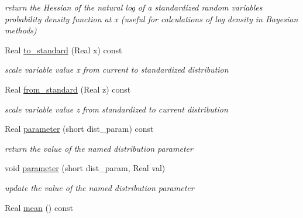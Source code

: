 \begin{DoxyCompactItemize}
\begin{DoxyCompactList}\small\item\em return the Hessian of the natural log of a standardized random variable\textquotesingle{}s probability density function at x (useful for calculations of log density in Bayesian methods) \end{DoxyCompactList}\item 
Real \hyperlink{classPecos_1_1UniformRandomVariable_a42e98c7343a1ce031f5481c11476fa73}{to\+\_\+standard} (Real x) const \label{classPecos_1_1UniformRandomVariable_a42e98c7343a1ce031f5481c11476fa73}

\begin{DoxyCompactList}\small\item\em scale variable value x from current to standardized distribution \end{DoxyCompactList}\item 
Real \hyperlink{classPecos_1_1UniformRandomVariable_a05e16ccd21e4fe4f3f74a1a98ae9dc74}{from\+\_\+standard} (Real z) const \label{classPecos_1_1UniformRandomVariable_a05e16ccd21e4fe4f3f74a1a98ae9dc74}

\begin{DoxyCompactList}\small\item\em scale variable value z from standardized to current distribution \end{DoxyCompactList}\item 
Real \hyperlink{classPecos_1_1UniformRandomVariable_aa891dab1ae9a225f493e3a0e5032b778}{parameter} (short dist\+\_\+param) const \label{classPecos_1_1UniformRandomVariable_aa891dab1ae9a225f493e3a0e5032b778}

\begin{DoxyCompactList}\small\item\em return the value of the named distribution parameter \end{DoxyCompactList}\item 
void \hyperlink{classPecos_1_1UniformRandomVariable_ae8e123224f588aee676d5d56d5ca900d}{parameter} (short dist\+\_\+param, Real val)\label{classPecos_1_1UniformRandomVariable_ae8e123224f588aee676d5d56d5ca900d}

\begin{DoxyCompactList}\small\item\em update the value of the named distribution parameter \end{DoxyCompactList}\item 
Real \hyperlink{classPecos_1_1UniformRandomVariable_a962ffe5a3593be370d5c883365c060f4}{mean} () const \label{classPecos_1_1UniformRandomVariable_a962ffe5a3593be370d5c883365c060f4}


\end{DoxyCompactItemize}

